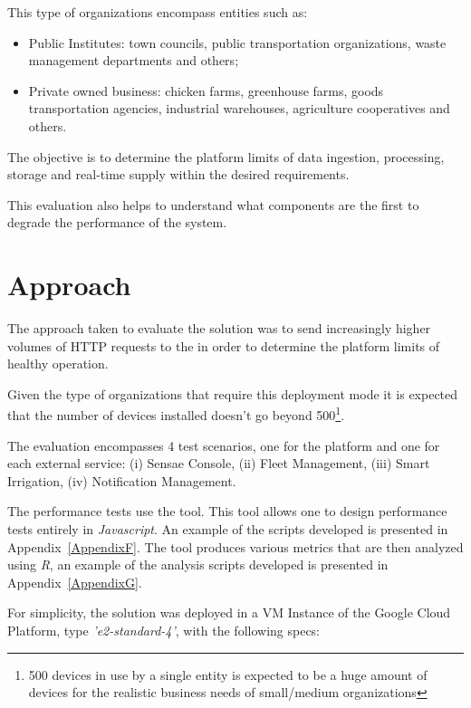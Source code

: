 This type of organizations encompass entities such as:

\begin{itemize}
    \item Public Institutes: town councils, public transportation organizations, waste management departments and others;
    \item Private owned business: chicken farms, greenhouse farms, goods transportation agencies, industrial warehouses, agriculture cooperatives and others.
\end{itemize}

The objective is to determine the platform limits of data ingestion, processing, storage and real-time supply within the desired requirements.

This evaluation also helps to understand what components are the first to degrade the performance of the system.

\section{Approach}
\label{sec:evaluation:approach}

The approach taken to evaluate the solution was to send increasingly higher volumes of HTTP requests to the  in order to determine the platform limits of healthy operation.

Given the type of organizations that require this deployment mode it is expected that the number of devices installed doesn't go beyond 500\footnote{500 devices in use by a single entity is expected to be a huge amount of devices for the realistic business needs of small/medium organizations}.

The evaluation encompasses 4 test scenarios, one for the platform and one for each external service: (i) Sensae Console, (ii) Fleet Management, (iii) Smart Irrigation, (iv) Notification Management.

The performance tests use the  tool. This tool allows one to design performance tests entirely in \textit{Javascript}. An example of the scripts developed is presented in Appendix~\ref{AppendixF}. The  tool produces various metrics that are then analyzed using \textit{R}, an example of the analysis scripts developed is presented in Appendix~\ref{AppendixG}.

For simplicity, the solution was deployed in a \gls{VM} Instance of the Google Cloud Platform, type \textit{'e2-standard-4'}, with the following specs:

